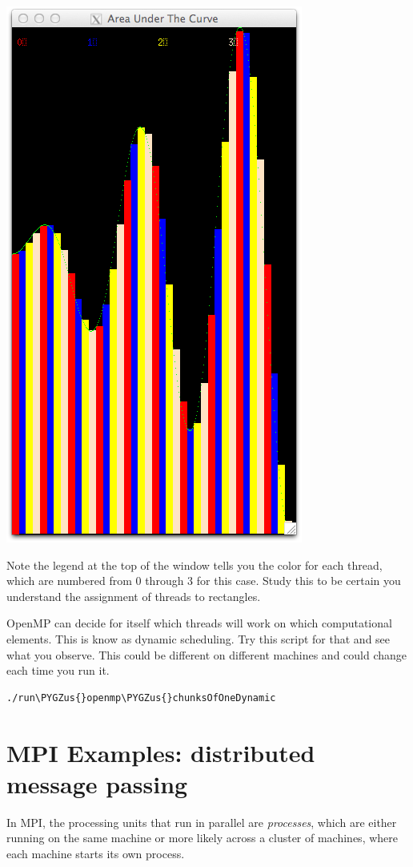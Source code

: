 \documentclass[letterpaper,10pt,openany,oneside]{sphinxmanual}
\def\PYGZus{\char`\_}
\begin{document}
\includegraphics{run_openmp_equalChunks.png}

Note the legend at the top of the window tells you the color for each thread, which are numbered from 0 through 3 for this case. Study this to be certain you understand the assignment of threads to rectangles.

OpenMP can decide for itself which threads will work on which computational elements. This is know as dynamic scheduling.  Try this script for that and see what you observe.  This could be different on different machines and could change each time you run it.

\begin{Verbatim}[commandchars=\\\{\}]
./run\PYGZus{}openmp\PYGZus{}chunksOfOneDynamic
\end{Verbatim}


\section{MPI Examples: distributed message passing}
\label{ParallelVis:mpi-examples-distributed-message-passing}
In MPI, the processing units that run in parallel are \emph{processes}, which are either running on the same machine or more likely across a cluster of machines, where each machine starts its own process.
\end{document}

